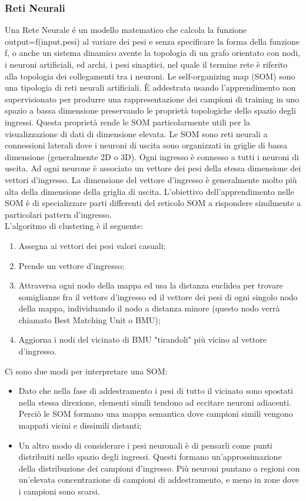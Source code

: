 \subsubsection{Reti Neurali}
Una Rete Neurale é un modello matematico che calcola la funzione output=f(input,pesi) al variare dei pesi e senza specificare la forma della funzione f, o anche un sistema dinamico avente la topologia di un grafo orientato con nodi, i neuroni artificiali, ed archi, i pesi sinaptici, nel quale il termine rete è riferito alla topologia dei collegamenti tra i neuroni. Le self-organizing map (SOM) sono una tipologia di reti neurali artificiali. È addestrata usando l'apprendimento non supervisionato per produrre una rappresentazione dei campioni di training in uno spazio a bassa dimensione preservando le proprietà topologiche dello spazio degli ingressi. Questa proprietà rende le SOM particolarmente utili per la visualizzazione di dati di dimensione elevata. Le SOM sono reti neurali a connessioni laterali dove i neuroni di uscita sono organizzati in griglie di bassa dimensione (generalmente 2D o 3D). Ogni ingresso è connesso a tutti i neuroni di uscita. Ad ogni neurone è associato un vettore dei pesi della stessa dimensione dei vettori d'ingresso. La dimensione del vettore d'ingresso è generalmente molto più alta della dimensione della griglia di uscita. L'obiettivo dell'apprendimento nelle SOM è di specializzare parti differenti del reticolo SOM a rispondere similmente a particolari pattern d'ingresso.\\
L'algoritmo di clustering è il seguente:
\begin{enumerate}
	\item Assegna ai vettori dei pesi valori casuali;
	\item Prende un vettore d'ingresso;
	\item Attraversa ogni nodo della mappa ed usa la distanza euclidea per trovare somiglianze fra il vettore d'ingresso ed il vettore dei pesi di ogni singolo nodo della mappa, individuando il nodo a distanza minore (questo nodo verrà chiamato Best Matching Unit o BMU);
	\item Aggiorna i nodi del vicinato di BMU "tirandoli" più vicino al vettore d'ingresso.
\end{enumerate}
Ci sono due modi per interpretare una SOM:
\begin{itemize}
	\item Dato che nella fase di addestramento i pesi di tutto il vicinato sono spostati nella stessa direzione, elementi simili tendono ad eccitare neuroni adiacenti. Perciò le SOM formano una mappa semantica dove campioni simili vengono mappati vicini e dissimili distanti;
	\item Un altro modo di considerare i pesi neuronali è di pensarli come punti distribuiti nello spazio degli ingressi. Questi formano un'approssimazione della distribuzione dei campioni d'ingresso. Più neuroni puntano a regioni con un'elevata concentrazione di campioni di addestramento, e meno in zone dove i campioni sono scarsi.
\end{itemize}
